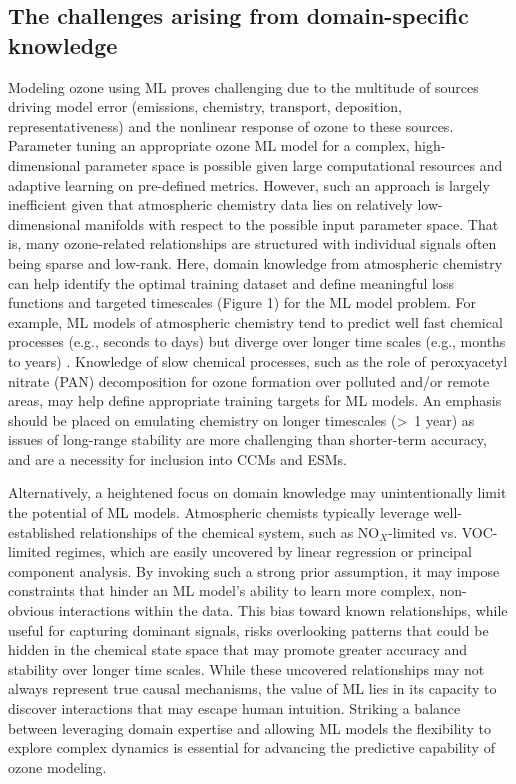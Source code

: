 \documentclass[gmd, manuscript]{copernicus}
\begin{document}
\subsection{The challenges arising from  domain-specific knowledge}
Modeling ozone using ML proves challenging due to the multitude of sources driving model error (emissions, chemistry, transport, deposition, representativeness) and the nonlinear response of ozone to these sources. Parameter tuning an appropriate ozone ML model for a complex, high-dimensional parameter space is possible given large computational resources and adaptive learning on pre-defined metrics. However, such an approach is largely inefficient given that atmospheric chemistry data lies on relatively low-dimensional manifolds with respect to the possible input parameter space. That is, many ozone-related relationships are structured with individual signals often being sparse and low-rank. Here, domain knowledge from atmospheric chemistry can help identify the optimal training dataset and define meaningful loss functions and targeted timescales (Figure 1) for the ML model problem. For example, ML models of atmospheric chemistry tend to predict well fast chemical processes (e.g., seconds to days) but diverge over longer time scales (e.g., months to years) \citep{kelp_toward_2020}. Knowledge of slow chemical processes, such as the role of peroxyacetyl nitrate (PAN) decomposition for ozone formation over polluted and/or remote areas, may help define appropriate training targets for ML models. An emphasis should be placed on emulating chemistry on longer timescales (>~1 year) as issues of long-range stability are more challenging than shorter-term accuracy, and are a necessity for inclusion into CCMs and ESMs. 

Alternatively, a heightened focus on domain knowledge may unintentionally limit the potential of ML models. Atmospheric chemists typically leverage well-established relationships of the chemical system, such as NO$_X$-limited vs. VOC-limited regimes, which are easily uncovered by linear regression or principal component analysis. By invoking such a strong prior assumption, it may impose constraints that hinder an ML model's ability to learn more complex, non-obvious interactions within the data. This bias toward known relationships, while useful for capturing dominant signals, risks overlooking patterns that could be hidden in the chemical state space that may promote greater accuracy and stability over longer time scales. While these uncovered relationships may not always represent true causal mechanisms, the value of ML lies in its capacity to discover interactions that may escape human intuition. Striking a balance between leveraging domain expertise and allowing ML models the flexibility to explore complex dynamics is essential for advancing the predictive capability of ozone modeling.
\end{document}
